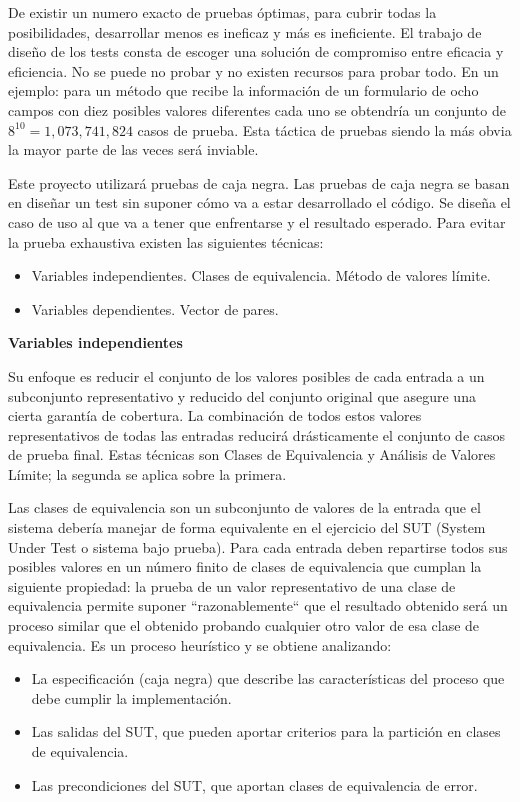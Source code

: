 De existir un numero exacto de pruebas óptimas, para cubrir todas la posibilidades, desarrollar menos es ineficaz y más es ineficiente.
El trabajo de diseño de los tests consta de escoger una solución de compromiso entre eficacia y eficiencia.
No se puede no probar y no existen recursos para probar todo.
En un ejemplo: para un método que recibe la información de un formulario de ocho campos con diez posibles valores diferentes cada uno se obtendría un conjunto de $8^{10} = 1,073,741,824$ casos de prueba.
Esta táctica de pruebas siendo la más obvia la mayor parte de las veces será inviable.

Este proyecto utilizará pruebas de caja negra.
Las pruebas de caja negra se basan en diseñar un test sin suponer cómo va a estar desarrollado el código.
Se diseña el caso de uso al que va a tener que enfrentarse y el resultado esperado.
Para evitar la prueba exhaustiva existen las siguientes técnicas:

\begin{itemize}
    \item Variables independientes.
    \subitem Clases de equivalencia.
    \subitem Método de valores límite.
    \item Variables dependientes.
    \subitem Vector de pares.
\end{itemize}

\textbf{Variables independientes}

Su enfoque es reducir el conjunto de los valores posibles de cada entrada a un subconjunto representativo y reducido del conjunto original que asegure una cierta garantía de cobertura.
La combinación de todos estos valores representativos de todas las entradas reducirá drásticamente el conjunto de casos de prueba final.
Estas técnicas son Clases de Equivalencia y Análisis de Valores Límite;
la segunda se aplica sobre la primera.

Las clases de equivalencia son un subconjunto de valores de la entrada que el sistema debería manejar de forma equivalente en el ejercicio del \gls{SUT} (System Under Test o sistema bajo prueba).
Para cada entrada deben repartirse todos sus posibles valores en un número finito de clases de equivalencia que cumplan la siguiente propiedad: la prueba de un valor representativo de una clase de equivalencia permite suponer “razonablemente“ que el resultado obtenido será un proceso similar que el obtenido probando cualquier otro valor de esa clase de equivalencia.
Es un proceso heurístico y se obtiene analizando:
\begin{itemize}
    \item La especificación (caja negra) que describe las características del proceso que debe cumplir la implementación.
    \item Las salidas del SUT, que pueden aportar criterios para la partición en clases de equivalencia.
    \item Las precondiciones del SUT, que aportan clases de equivalencia de error.
\end{itemize}

